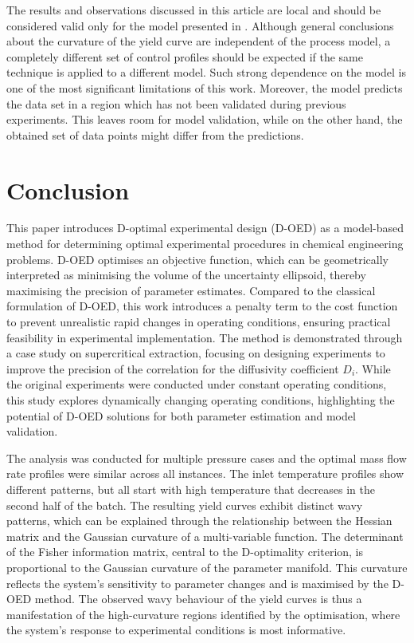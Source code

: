 \documentclass[a4paper,fleqn]{cas-dc}
\begin{document}
		The results and observations discussed in this article are local and should be considered valid only for the model presented in \citet{Sliczniuk2024}. Although general conclusions about the curvature of the yield curve are independent of the process model, a completely different set of control profiles should be expected if the same technique is applied to a different model. Such strong dependence on the model is one of the most significant limitations of this work. Moreover, the model predicts the data set in a region which has not been validated during previous experiments. This leaves room for model validation, while on the other hand, the obtained set of data points might differ from the predictions.
		
		\section{Conclusion} \label{CH: Conclusion}
		This paper introduces D-optimal experimental design (D-OED) as a model-based method for determining optimal	experimental procedures in chemical engineering problems. D-OED optimises an objective function, which can be geometrically	interpreted as minimising the volume of the uncertainty ellipsoid, thereby maximising the precision of parameter estimates. Compared to the classical formulation of D-OED, this work introduces a penalty term to the cost function to prevent unrealistic rapid changes in operating conditions, ensuring practical feasibility in experimental	implementation. The method is demonstrated through a case study on supercritical extraction, focusing on designing experiments	to improve the precision of the correlation for the diffusivity coefficient $D_i$. While the original experiments were conducted under constant operating conditions, this study explores dynamically changing operating conditions, highlighting the potential of D-OED solutions for both parameter estimation and model validation.
		
		The analysis was conducted for multiple pressure cases and the optimal mass flow rate profiles were similar across all instances. The inlet temperature profiles show different patterns, but all start with high temperature that decreases in	the second half of the batch. The resulting yield curves exhibit distinct wavy patterns, which can be explained through	the relationship between the Hessian matrix and the Gaussian curvature of a multi-variable function. The determinant of the Fisher information matrix, central to the D-optimality criterion, is proportional to the Gaussian curvature of the parameter manifold. This curvature reflects the system’s sensitivity to parameter changes and is maximised by the D-OED method. The observed wavy behaviour of the yield curves is thus a manifestation of the high-curvature regions identified by the optimisation, where the system’s response to experimental conditions is most informative.
		
\end{document}
